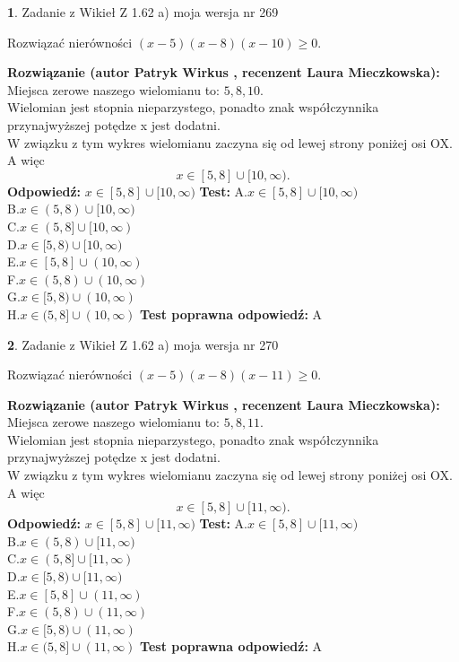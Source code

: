 \documentclass[12pt, a4paper]{article}
\theoremstyle{definition} %
\newtheorem{zad}{}
\newcommand{\zadStart}[1]{\begin{zad}#1\newline}
\newcommand{\zadStop}{\end{zad}}
\newcommand{\rozwStart}[2]{\noindent \textbf{Rozwiązanie (autor #1 , recenzent #2): }\newline}
\newcommand{\rozwStop}{\newline}
\newcommand{\odpStart}{\noindent \textbf{Odpowiedź:}\newline}
\newcommand{\odpStop}{\newline}
\newcommand{\testStart}{\noindent \textbf{Test:}\newline}
\newcommand{\testStop}{\newline}
\newcommand{\kluczStart}{\noindent \textbf{Test poprawna odpowiedź:}\newline}
\newcommand{\kluczStop}{\newline}
\begin{document}
\zadStart{Zadanie z Wikieł Z 1.62 a) moja wersja nr 269}

Rozwiązać nierówności $(x-5)(x-8)(x-10)\ge0$.
\zadStop
\rozwStart{Patryk Wirkus}{Laura Mieczkowska}
Miejsca zerowe naszego wielomianu to: $5, 8, 10$.\\
Wielomian jest stopnia nieparzystego, ponadto znak współczynnika przy\linebreak najwyższej potędze x jest dodatni.\\ W związku z tym wykres wielomianu zaczyna się od lewej strony poniżej osi OX. A więc $$x \in [5,8] \cup [10,\infty).$$
\rozwStop
\odpStart
$x \in [5,8] \cup [10,\infty)$
\odpStop
\testStart
A.$x \in [5,8] \cup [10,\infty)$\\
B.$x \in (5,8) \cup [10,\infty)$\\
C.$x \in (5,8] \cup [10,\infty)$\\
D.$x \in [5,8) \cup [10,\infty)$\\
E.$x \in [5,8] \cup (10,\infty)$\\
F.$x \in (5,8) \cup (10,\infty)$\\
G.$x \in [5,8) \cup (10,\infty)$\\
H.$x \in (5,8] \cup (10,\infty)$
\testStop
\kluczStart
A
\kluczStop



\zadStart{Zadanie z Wikieł Z 1.62 a) moja wersja nr 270}

Rozwiązać nierówności $(x-5)(x-8)(x-11)\ge0$.
\zadStop
\rozwStart{Patryk Wirkus}{Laura Mieczkowska}
Miejsca zerowe naszego wielomianu to: $5, 8, 11$.\\
Wielomian jest stopnia nieparzystego, ponadto znak współczynnika przy\linebreak najwyższej potędze x jest dodatni.\\ W związku z tym wykres wielomianu zaczyna się od lewej strony poniżej osi OX. A więc $$x \in [5,8] \cup [11,\infty).$$
\rozwStop
\odpStart
$x \in [5,8] \cup [11,\infty)$
\odpStop
\testStart
A.$x \in [5,8] \cup [11,\infty)$\\
B.$x \in (5,8) \cup [11,\infty)$\\
C.$x \in (5,8] \cup [11,\infty)$\\
D.$x \in [5,8) \cup [11,\infty)$\\
E.$x \in [5,8] \cup (11,\infty)$\\
F.$x \in (5,8) \cup (11,\infty)$\\
G.$x \in [5,8) \cup (11,\infty)$\\
H.$x \in (5,8] \cup (11,\infty)$
\testStop
\kluczStart
A
\kluczStop
\end{document}
